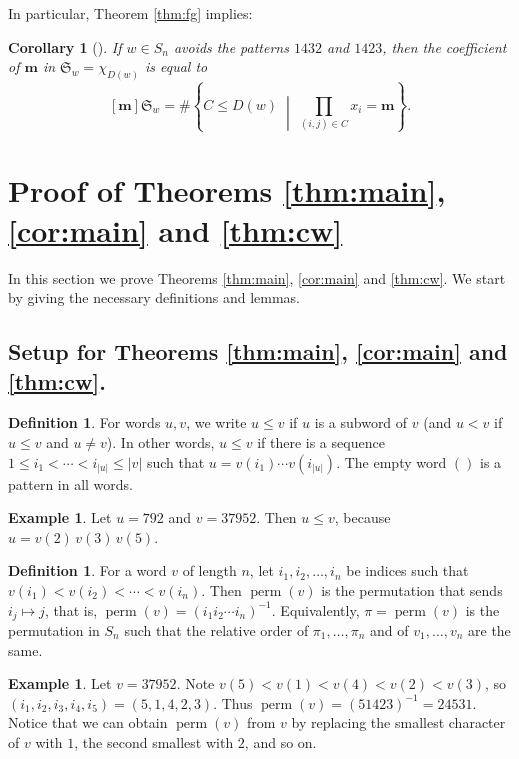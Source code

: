 \documentclass{amsart}
\newtheorem{corollary}[theorem]{Corollary}
\theoremstyle{definition}
\newtheorem{definition}[theorem]{Definition}
\newtheorem{example}[theorem]{Example}
\theoremstyle{named}
\newcommand*{\Schub}{\mathfrak{S}}
\DeclareMathOperator*{\perm}{perm}
\begin{document}
In particular, Theorem \ref{thm:fg} implies:

\begin{corollary}[\cite{FG}]
\label{cor:counting}
If $w \in S_n$ avoids the patterns $1432$ and $1423$, then the coefficient of $\bm{m}$ in $\Schub_w = \chi_{D(w)}$ is equal to
\[
[\bm{m}]\Schub_w=\# \left\{ C \le D(w) \;\middle|\; \prod_{(i, j) \in C} x_i = \bm{m} \right\}.
\]
\end{corollary}

	\section{Proof of Theorems \ref{thm:main}, \ref{cor:main} and \ref{thm:cw}}
	\label{sec:main}

In this section we prove Theorems \ref{thm:main}, \ref{cor:main} and \ref{thm:cw}. We start by giving the necessary definitions and lemmas. 

\subsection{Setup for Theorems \ref{thm:main}, \ref{cor:main}  and \ref{thm:cw}.}
\begin{definition}
For words $u, v$, we write $u \le v$ if $u$ is a subword of $v$ (and $u < v$ if $u \le v$ and $u \ne v$). In other words, $u \le v$ if there is a sequence $1 \le i_1 < \cdots < i_{\left|u\right|} \le \left|v\right|$ such that $u = v(i_1) \cdots v(i_{\left|u\right|})$. The empty word $()$ is a pattern in all words.
\end{definition}

\begin{example}
Let $u = 792$ and $v = 37952$. Then $u \le v$, because $u = v(2)\,v(3)\,v(5)$.
\end{example}

\begin{definition}
For a word $v$ of length $n$, let $i_1, i_2, \dots, i_n$ be indices such that $v(i_1) < v(i_2) < \cdots < v(i_n)$. Then $\perm(v)$ is the permutation that sends $i_j \mapsto j$, that is, $\perm(v) = (i_1i_2 \cdots i_n)^{-1}$. Equivalently, $\pi = \perm(v)$ is the permutation in $S_n$ such that the relative order of $\pi_1, \dots, \pi_n$ and of $v_1, \dots, v_n$ are the same.
\end{definition}

\begin{example}
Let $v = 37952$. Note $v(5) < v(1) < v(4) < v(2) < v(3)$, so $(i_1, i_2, i_3, i_4, i_5) = (5, 1, 4, 2, 3)$. Thus $\perm(v) = (51423)^{-1} = 24531$. Notice that we can obtain $\perm(v)$ from $v$ by replacing the smallest character of $v$ with $1$, the second smallest with $2$, and so on.
\end{example}
\end{document}
